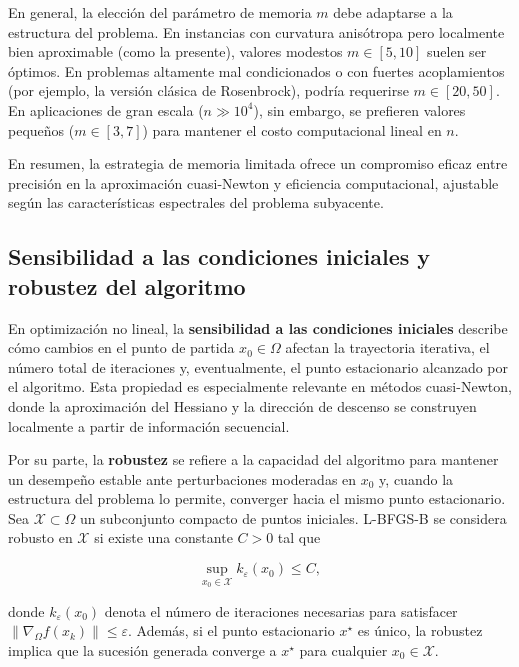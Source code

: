 \documentclass[
  spanish,
  us-letterpaper,
  DIV=11,
  numbers=noendperiod]{scrreprt}
\numberwithin{equation}{section}
\begin{document}
En general, la elección del parámetro de memoria \(m\) debe adaptarse a
la estructura del problema. En instancias con curvatura anisótropa pero
localmente bien aproximable (como la presente), valores modestos
\(m \in [5,10]\) suelen ser óptimos. En problemas altamente mal
condicionados o con fuertes acoplamientos (por ejemplo, la versión
clásica de Rosenbrock), podría requerirse \(m \in [20,50]\). En
aplicaciones de gran escala (\(n \gg 10^4\)), sin embargo, se prefieren
valores pequeños (\(m \in [3,7]\)) para mantener el costo computacional
lineal en \(n\).

En resumen, la estrategia de memoria limitada ofrece un compromiso
eficaz entre precisión en la aproximación cuasi-Newton y eficiencia
computacional, ajustable según las características espectrales del
problema subyacente.

\subsection{Sensibilidad a las condiciones iniciales y robustez del
algoritmo}\label{sensibilidad-a-las-condiciones-iniciales-y-robustez-del-algoritmo}

En optimización no lineal, la \textbf{sensibilidad a las condiciones
iniciales} describe cómo cambios en el punto de partida
\(x_0 \in \Omega\) afectan la trayectoria iterativa, el número total de
iteraciones y, eventualmente, el punto estacionario alcanzado por el
algoritmo. Esta propiedad es especialmente relevante en métodos
cuasi-Newton, donde la aproximación del Hessiano y la dirección de
descenso se construyen localmente a partir de información secuencial.

Por su parte, la \textbf{robustez} se refiere a la capacidad del
algoritmo para mantener un desempeño estable ante perturbaciones
moderadas en \(x_0\) y, cuando la estructura del problema lo permite,
converger hacia el mismo punto estacionario. Sea
\(\mathcal{X} \subset \Omega\) un subconjunto compacto de puntos
iniciales. L-BFGS-B se considera robusto en \(\mathcal{X}\) si existe
una constante \(C > 0\) tal que

\[
\sup_{x_0 \in \mathcal{X}} k_\varepsilon (x_0) \le C,
\]

donde \(k_\varepsilon(x_0)\) denota el número de iteraciones necesarias
para satisfacer \(\|\nabla_{\Omega} f(x_k)\| \le \varepsilon\). Además,
si el punto estacionario \(x^\star\) es único, la robustez implica que
la sucesión generada converge a \(x^\star\) para cualquier
\(x_0 \in \mathcal{X}\).
\end{document}
